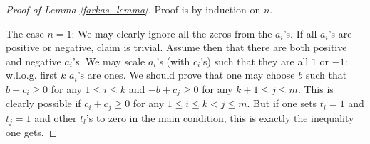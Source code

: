 \begin{proof}[Proof of Lemma \ref{farkas_lemma}]
	Proof is by induction on $n$.

	The case $n = 1$: We may clearly ignore all the zeros from the $a_{i}$'s. If all $a_{i}$'s are positive or negative, claim is trivial. Assume then that there are both positive and negative $a_{i}$'s. We may scale $a_{i}$'s (with $c_{i}$'s) such that they are all $1$ or $-1$: w.l.o.g. first $k$ $a_{i}$'s are ones. We should prove that one may choose $b$ such that $b + c_{i} \geq 0$ for any $1 \leq i \leq k$ and $-b + c_{j} \geq 0$ for any $k + 1 \leq j \leq m$. This is clearly possible if $c_{i} + c_{j} \geq 0$ for any $1 \leq i \leq k < j \leq m$. But if one sets $t_{i} = 1$ and $t_{j} = 1$ and other $t_{l}$'s to zero in the main condition, this is exactly the inequality one gets.


\end{proof}
